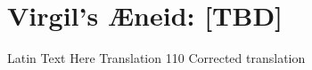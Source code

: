 \documentclass[]{article}
\begin{document}
\section*{Virgil's {\AE}neid:  [TBD]} %


\latline
  {Latin Text Here}
  {Translation}
  {110} %
  {Corrected translation}
  {
  }
\end{document}
